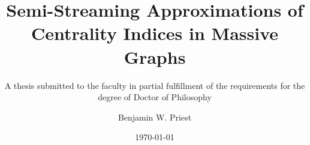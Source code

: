 \documentclass{beamer}
\title[Semi-Streaming Centrality]{Semi-Streaming Approximations of Centrality Indices in Massive Graphs} %
\subtitle{A thesis submitted to the faculty in partial fulfillment of the requirements for the degree of Doctor of Philosophy}
\author[Priest]{Benjamin W. Priest} %
\institute[Dartmouth] %
{
Thayer School of Engineering \\
 Dartmouth College \\ %
\medskip
\textit{benjamin.w.priest.th@dartmouth}\\ %
}
\date{\today} %
\begin{document}
\begin{frame}
\titlepage %
\end{frame}



\end{document}
